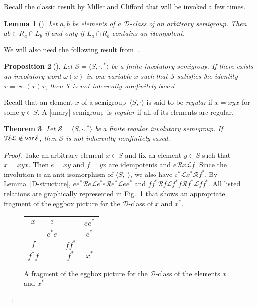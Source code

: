 \documentclass[smallextended]{svjour3}
\def\om{\omega}
\def\Rc{\mathrel{\mathscr{R}}}
\def\Lc{\mathrel{\mathscr{L}}}
\newcommand{\sgp}{semi\-group}
\newcommand{\is}{involutory semi\-group}
\newcommand{\fis}{finite involutory semi\-group}
\newcommand{\infb}{inherently non\-finitely based}
\newcommand{\TSL}{\ensuremath{\mathcal{T\kern-.5pt S\kern-.5pt L}}}
\newtheorem{Thm}{Theorem}[section]
\newtheorem{Prop}[Thm]{Proposition}
\newtheorem{Lemma}[Thm]{Lemma}
\DeclareMathOperator{\var}{\mathsf{var}}
\begin{document}
Recall the classic result by Miller and Clifford that will be invoked a few times.

\begin{Lemma}[{\mdseries\cite[Proposition~2.3.7]{how}}]
\label{Miller&Clifford} Let $a,b$ be elements of a $\mathscr{D}$-class of an arbitrary \sgp. Then $ab\in R_a\cap L_b$ if and only if
$L_a\cap R_b$ contains an idempotent.
\end{Lemma}

We will also need the following result from~\cite{ADV:2012}.

\begin{Prop}[{\mdseries\cite[Proposition~2.9]{ADV:2012}}]
\label{NINFB} Let $\mathcal{S}=\langle S,\cdot,{}^*\rangle$ be a \fis. If there exists an involutory word $\om(x)$ in one variable $x$ such
that $\mathcal{S}$ satisfies the identity $x=x\om(x)x$, then $\mathcal{S}$ is not \infb.
\end{Prop}

Recall that an element $x$ of a \sgp\ $\langle S,\cdot\rangle$ is said to be \emph{regular} if $x=xyx$ for some $y\in S$. A [unary] \sgp\
is \emph{regular} if all of its elements are regular.

\begin{Thm}
\label{regular} Let $\mathcal{S}=\langle S,\cdot,{}^*\rangle$ be a finite regular \is. If $\TSL\notin\var\mathcal{S}$, then $\mathcal{S}$
is not \infb.
\end{Thm}

\begin{proof}
Take an arbitrary element $x\in S$ and fix an element $y\in S$ such that $x=xyx$. Then $e=xy$ and $f=yx$ are idempotents and $e\Rc x\Lc f$.
Since the involution is an anti-isomorphism of $\langle S,\cdot\rangle$, we also have $e^*\Lc x^*\Rc f^*$. By Lemma~\ref{D-structure},
$ee^*\Rc e\Lc e^*e\Rc e^*\Lc ee^*$ and $ff^*\Rc f\Lc f^*f\Rc f^*\Lc ff^*$.  All listed relations are graphically represented in
Fig.~\ref{fig:D-class} that shows an appropriate fragment of the eggbox picture for the $\mathscr{D}$-class of $x$ and $x^*$.
\begin{figure}[th]
\begin{center}
{\large \begin{tabular}{|c|c|c|c|}
\hline $x$\rule[-5pt]{0pt}{16pt} & $e$ & & $ee^*$\\
\hline \rule[-5pt]{0pt}{16pt}& $e^*e$  & & $e^*$\\
\hline $f$\rule[-5pt]{0pt}{16pt} & \phantom{$f^*f$} & $ff^*$ &  \phantom{$f^*f$}\\
\hline $f^*f$\rule[-5pt]{0pt}{16pt} & & $f^*$ & $x^*$ \\
\hline
\end{tabular}}
\caption{A fragment of the eggbox picture for the $\mathscr{D}$-class of the elements $x$ and $x^*$}\label{fig:D-class}
\end{center}
\end{figure}
\end{proof}
\end{document}
